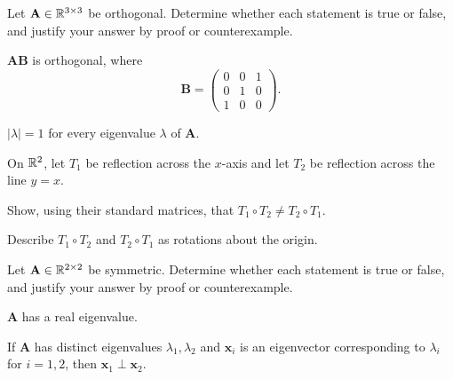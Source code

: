 \documentclass[11pt,oneside]{article}
\begin{document}
\begin{problem}
Let $\mathbf A\in\mathbb{R}^{3\times3}$ be orthogonal. Determine whether each statement is true or false, and justify your answer by proof or counterexample.
\begin{problemchoices}
\item $\mathbf A\mathbf B$ is orthogonal, where
\[
\mathbf B=
\begin{pmatrix}
0&0&1\\
0&1&0\\
1&0&0
\end{pmatrix}.
\]
\item $|\lambda|=1$ for every eigenvalue $\lambda$ of $\mathbf A$.
\end{problemchoices}
\end{problem}

\begin{problem}
On $\mathbb{R}^2$, let $T_1$ be reflection across the $x$-axis and let $T_2$ be reflection across the line $y=x$.
\begin{problemsubparts}
\item Show, using their standard matrices, that $T_1\circ T_2\ne T_2\circ T_1$.
\item Describe $T_1\circ T_2$ and $T_2\circ T_1$ as rotations about the origin.
\end{problemsubparts}
\end{problem}

\begin{problem}
Let $\mathbf A\in\mathbb{R}^{2\times2}$ be symmetric. Determine whether each statement is true or false, and justify your answer by proof or counterexample.
\begin{problemchoices}
\item $\mathbf A$ has a real eigenvalue.
\item If $\mathbf A$ has distinct eigenvalues $\lambda_1,\lambda_2$ and $\mathbf x_i$ is an eigenvector corresponding to $\lambda_i$ for $i=1,2$, then $\mathbf x_1\perp\mathbf x_2$.
\end{problemchoices}
\end{problem}
\end{document}
